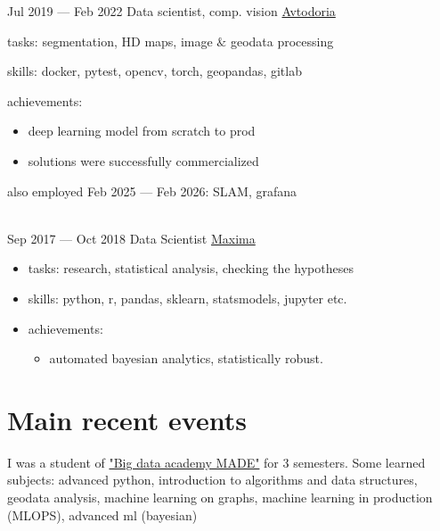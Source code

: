 \documentclass[letterpaper]{twentysecondcv} %
\begin{document}
\begin{twenty}
        \twentyitem
        {Jul 2019 —}
        {Feb 2022}
        {Data scientist, comp. vision}
        {  \href{https://avtodoria.ru/}{Avtodoria}}
        {}
        {
        {\begin{itemize}
            \item tasks: segmentation, HD maps, image $\&$ geodata processing
            \item skills: docker, pytest, opencv, torch, geopandas, gitlab
            \item achievements:
            {\begin{itemize}
                \item deep learning model from scratch to prod
                \item solutions were successfully commercialized
            \end{itemize}
            \item also employed Feb 2025 — Feb 2026: SLAM, grafana
           }
        \end{itemize}}
        }
        \\
        \twentyitem
        {Sep 2017 —}
        {Oct 2018}
        {Data Scientist}
        {\href{http://maxima.life/}{Maxima}}
        {}
        {
        {\begin{itemize}
            \item tasks: research, statistical analysis, checking the hypotheses
            \item skills: python, r, pandas, sklearn, statsmodels, jupyter etc.
            \item achievements:
            {\begin{itemize}
                \item automated bayesian analytics, statistically robust.
            \end{itemize}
            }            
        \end{itemize}}
        }
\end{twenty}


\section{Main recent events}


I was a student of \href{https://data.vk.company/}{"Big data academy MADE"} for 3 semesters. Some learned subjects: advanced python, introduction to algorithms and data structures, geodata analysis, machine learning on graphs, machine learning in production (MLOPS), advanced ml (bayesian)
\end{document}
